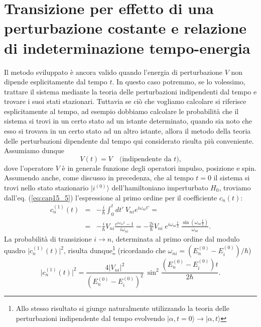 \section{Transizione per effetto di una perturbazione costante e relazione di indeterminazione tempo-energia}
Il metodo sviluppato è ancora valido quando l'energia di perturbazione $V$ non dipende esplicitamente dal tempo $t$. In questo caso potremmo, se lo volessimo, trattare il sistema  mediante la teoria delle perturbazioni indipendenti dal tempo e trovare i suoi stati stazionari. Tuttavia se ciò che vogliamo calcolare si riferisce esplicitamente al tempo, ad esempio dobbiamo calcolare le probabilità che il sistema si trovi in un certo stato ad un istante determinato, quando sia noto che esso si trovava in un certo stato ad un altro istante, allora il metodo della teoria delle perturbazioni dipendente dal tempo qui considerato risulta più conveniente.\\
Assumiamo dunque
\begin{equation}
V(t) = V \quad \textrm{(indipendente da }t\textrm{),}
\end{equation}
dove l'operatore $V$ è in generale funzione degli operatori impulso, posizione e spin.\\
Assumendo anche, come discusso in precedenza, che al tempo $t=0$ il sistema si trovi nello stato stazionario $\vert i^{(0)}\rangle $ dell'hamiltoniano imperturbato $H_0$, troviamo dall'eq. (\ref{eq:cap15_5}) l'espressione al primo ordine per il coefficiente $c_n (t)$:
\begin{eqnarray}
c_n ^{(1)} (t) & = & -\frac{i}{\hbar} \int _0 ^t dt'\ V_{ni} e^{i \omega _{ni} t'} = \nonumber \\
&=& -\frac{i}{\hbar} V_{ni} \frac{e^{i \omega _{ni} t}-1}{i \omega _{ni}}= -\frac{2i}{\hbar} V_{ni}\ e^{i \omega _{ni} \frac{t}{2}}\ \frac{\sin{\left(\omega _{ni} \frac{t}{2}\right)}}{\omega _{ni}} .
\end{eqnarray}
La probabilità di transizione $i\rightarrow n $, determinata al primo ordine dal modulo quadro $\vert c_n ^{(1)} (t) \vert ^2$, risulta dunque\footnote{Allo stesso risultato si giunge naturalmente utilizzando la teoria delle perturbazioni indipendente dal tempo evolvendo $ \vert \alpha , t =0 \rangle \rightarrow \vert \alpha , t \rangle$} (ricordando che $\omega _{ni} = ( E_n ^{(0)}- E_i ^{(0)})/ \hbar$)
\begin{equation}
\vert c_n ^{(1)} (t) \vert ^2 = \frac{4\vert V_{ni} \vert ^2}{\left( E_n ^{(0)} - E_i ^{(0)} \right) ^2}\ \sin ^2\frac{\left( E_n ^{(0)} - E_i ^{(0)} \right) t}{2 \hbar}.
\label{eq:cap15_6}
\end{equation}
